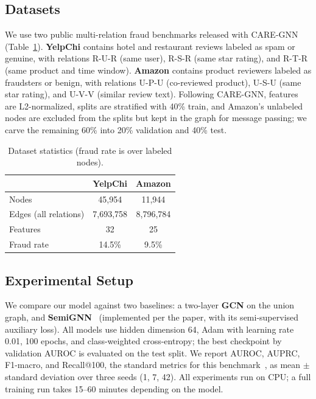 \documentclass[conference]{IEEEtran}
\begin{document}
\subsection{Datasets}
We use two public multi-relation fraud benchmarks released with
CARE-GNN~\cite{DBLP:conf/cikm/DouL0DPY20} (Table~\ref{tab:datasets}).
\textbf{YelpChi} contains hotel and restaurant reviews labeled as spam or
genuine, with relations R-U-R (same user), R-S-R (same star rating), and
R-T-R (same product and time window). \textbf{Amazon} contains product
reviewers labeled as fraudsters or benign, with relations U-P-U
(co-reviewed product), U-S-U (same star rating), and U-V-V (similar review
text). Following CARE-GNN, features are L2-normalized, splits are stratified
with 40\% train, and Amazon's unlabeled nodes are excluded from the splits
but kept in the graph for message passing; we carve the remaining 60\% into
20\% validation and 40\% test.

\begin{table}[t]
\centering
\caption{Dataset statistics (fraud rate is over labeled nodes).}
\label{tab:datasets}
\begin{tabular}{lcc}
\hline
 & \textbf{YelpChi} & \textbf{Amazon} \\
\hline
Nodes & 45{,}954 & 11{,}944 \\
Edges (all relations) & 7{,}693{,}758 & 8{,}796{,}784 \\
Features & 32 & 25 \\
Fraud rate & 14.5\% & 9.5\% \\
\hline
\end{tabular}
\end{table}

\subsection{Experimental Setup}
We compare our model against two baselines: a two-layer \textbf{GCN} on the
union graph, and \textbf{SemiGNN}~\cite{DBLP:conf/icdm/WangQL0JWFYZY19}
(implemented per the paper, with its semi-supervised auxiliary loss). All
models use hidden dimension 64, Adam with learning rate 0.01, 100 epochs,
and class-weighted cross-entropy; the best checkpoint by validation AUROC
is evaluated on the test split. We report AUROC, AUPRC, F1-macro, and
Recall@100, the standard metrics for this
benchmark~\cite{DBLP:conf/cikm/DouL0DPY20,DBLP:conf/www/LiuAQCFYH21}, as
mean $\pm$ standard deviation over three seeds (1, 7, 42). All experiments
run on CPU; a full training run takes 15--60 minutes depending on the model.
\end{document}
